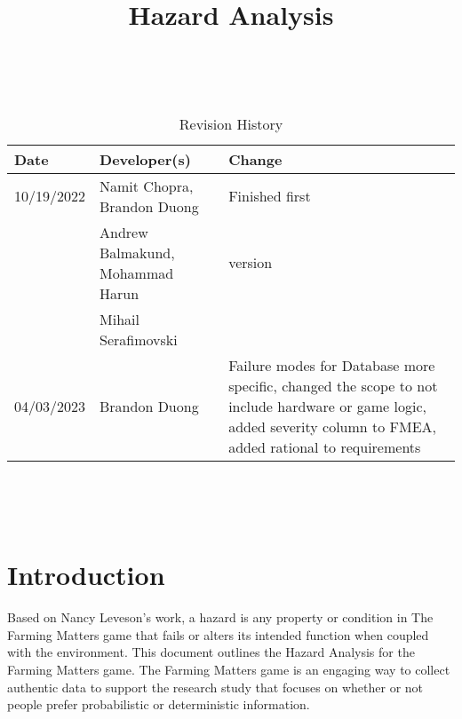 \documentclass{article}
\title{Hazard Analysis\\\progname}
\author{\authname}
\date{}
\begin{document}
\maketitle
\thispagestyle{empty}

~\newpage



\begin{table}[hp]
\caption{Revision History} \label{TblRevisionHistory}
\begin{tabularx}{\textwidth}{llX}
\toprule
\textbf{Date} & \textbf{Developer(s)} & \textbf{Change}\\
\midrule
10/19/2022 & Namit Chopra, Brandon Duong  & Finished first \\
 & Andrew Balmakund, Mohammad Harun & version\\
 & Mihail Serafimovski & \\

 04/03/2023 & Brandon Duong & Failure modes for Database more specific, changed the scope to not include hardware or game logic, added severity column to FMEA, added rational to requirements\\
\bottomrule
\end{tabularx}
\end{table}

~\newpage

\tableofcontents
\listoftables
~\newpage



\section{Introduction}
Based on Nancy Leveson's work, a hazard is any property or condition in The Farming Matters game that fails or alters its intended function when coupled with the environment. This document outlines the Hazard Analysis for the Farming Matters game. The Farming Matters game is an engaging way to collect authentic data to support the research study that focuses on whether or not people prefer probabilistic or deterministic information.
\end{document}
